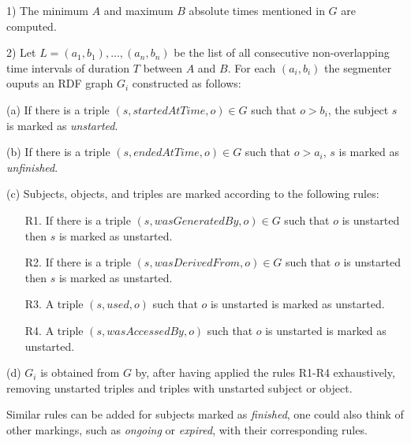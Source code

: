 \documentclass{article}
\begin{document}
1) The minimum $A$ and maximum $B$ absolute times mentioned in $G$ are computed.

2) Let $L = (a_1, b_1), \ldots, (a_n, b_n)$ be the list of all consecutive non-overlapping
time intervals of duration $T$ between $A$ and $B$. For each $(a_i, b_i)$ the segmenter ouputs an RDF graph $G_i$ constructed as follows:

(a) If there is a triple $(s, startedAtTime, o)\in G$ such that $o>b_i$, the subject $s$ is marked as {\em unstarted}.

(b) If there is a triple $(s, endedAtTime, o)\in G$ such that $o>a_i$, $s$ is marked as {\em unfinished}.

(c) Subjects, objects, and triples are marked according to the following rules:
\begin{itemize}
\item[R1.] If there is a triple $(s, wasGeneratedBy, o)\in G$ 
such that $o$ is unstarted then $s$ is marked as unstarted.
\item[R2.] If there is a triple $(s, wasDerivedFrom, o)\in G$ 
such that $o$ is unstarted then $s$ is marked as unstarted.
\item[R3.] A triple $(s, used, o)$ such that $o$ is unstarted is marked as unstarted.
\item[R4.] A triple $(s, wasAccessedBy, o)$ such that $o$ is unstarted is marked as unstarted.
\end{itemize}
(d) $G_i$ is obtained from $G$ by, after having applied the rules R1-R4 exhaustively, 
removing unstarted triples and triples with unstarted subject or object.

Similar rules can be added for subjects marked as {\em finished}, one could also think of 
other markings, such as {\em ongoing} or {\em expired}, with their corresponding rules.



\end{document}

